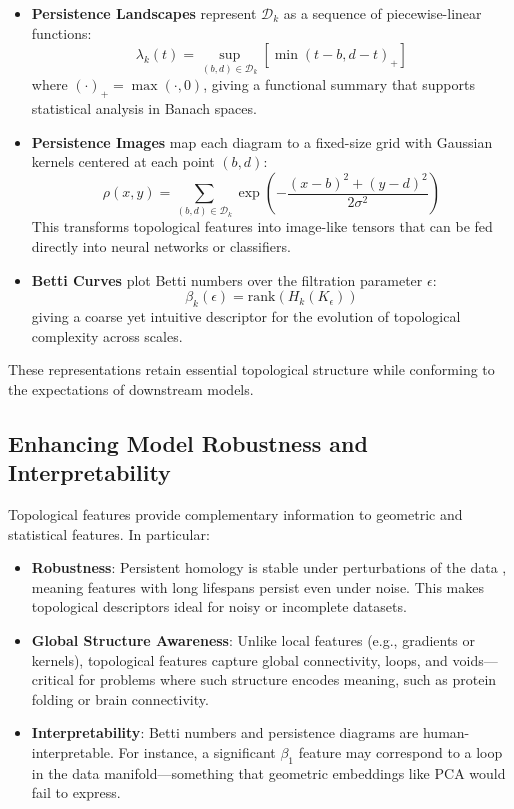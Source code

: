 \documentclass[9pt, twoside, twocolumn]{extarticle}
\begin{document}
        \begin{itemize}
            \item \textbf{Persistence Landscapes} \cite{bubenik2015statistical} represent $\mathcal{D}_k$ as a sequence of piecewise-linear functions:
            \[
            \lambda_k(t) = \sup_{(b,d) \in \mathcal{D}_k} \left[ \min\left( t - b, d - t \right)_+ \right]
            \]
            where $(\cdot)_+ = \max(\cdot, 0)$, giving a functional summary that supports statistical analysis in Banach spaces.

            \item \textbf{Persistence Images} \cite{adams2017persistence} map each diagram to a fixed-size grid with Gaussian kernels centered at each point $(b,d)$:
            \[
            \rho(x, y) = \sum_{(b,d) \in \mathcal{D}_k} \exp\left(-\frac{(x - b)^2 + (y - d)^2}{2\sigma^2}\right)
            \]
            This transforms topological features into image-like tensors that can be fed directly into neural networks or classifiers.

            \item \textbf{Betti Curves} plot Betti numbers over the filtration parameter $\epsilon$:
            \[
            \beta_k(\epsilon) = \text{rank}(H_k(K_\epsilon))
            \]
            giving a coarse yet intuitive descriptor for the evolution of topological complexity across scales.
        \end{itemize}

        These representations retain essential topological structure while conforming to the expectations of downstream models.

    \subsection*{Enhancing Model Robustness and Interpretability}

        Topological features provide complementary information to geometric and statistical features. In particular:

        \begin{itemize}
            \item \textbf{Robustness}: Persistent homology is stable under perturbations of the data \cite{chazal2021introduction}, meaning features with long lifespans persist even under noise. This makes topological descriptors ideal for noisy or incomplete datasets.
            \item \textbf{Global Structure Awareness}: Unlike local features (e.g., gradients or kernels), topological features capture global connectivity, loops, and voids—critical for problems where such structure encodes meaning, such as protein folding or brain connectivity.
            \item \textbf{Interpretability}: Betti numbers and persistence diagrams are human-interpretable. For instance, a significant $\beta_1$ feature may correspond to a loop in the data manifold—something that geometric embeddings like PCA would fail to express.
        \end{itemize}
\end{document}
